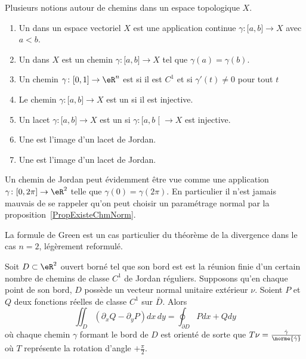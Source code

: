 \begin{definition}       \label{DEFooQZMSooYYkGDv}
    Plusieurs notions autour de chemins dans un espace topologique \( X\).
    \begin{enumerate}
        \item
    Un  dans un espace vectoriel \( X\) est une application continue \( \gamma\colon \mathopen[ a , b \mathclose]\to X\) avec \( a<b\).
        \item
    Un  dans \( X\) est un chemin \( \gamma\colon \mathopen[ a , b \mathclose]\to X\) tel que \( \gamma(a)=\gamma(b)\).
\item
    Un chemin \( \gamma\colon \mathopen[ 0 , 1 \mathclose]\to \eR^n\) est  si il est \( C^1\) et si \( \gamma'(t)\neq 0\) pour tout \( t\)
\item
    Le chemin \( \gamma\colon \mathopen[ a , b \mathclose]\to X\) est un  si il est injective.
\item
    Un lacet \( \gamma\colon \mathopen[ a , b \mathclose]\to X\) est un  si \( \gamma\colon \mathopen[ a , b \mathclose[\to X\) est injective.
        \item
            Une  est l'image d'un lacet de Jordan.
        \item 
            Une  est l'image d'un lacet de Jordan.
    \end{enumerate}
\end{definition}


\begin{normaltext}
    Un chemin de Jordan peut évidemment être vue comme une application \( \gamma\colon \mathopen[ 0 , 2\pi ]\to \eR^2\) telle que \( \gamma(0)=\gamma(2\pi)\). En particulier il n'est jamais mauvais de se rappeler qu'on peut choisir un paramétrage normal par la proposition~\ref{PropExisteChmNorm}.
\end{normaltext}

La formule de Green est un cas particulier du théorème de la divergence dans le cas \( n = 2\), légèrement reformulé.
\begin{theorem}
	Soit \( D \subset \eR^2\) ouvert borné tel que son bord est est la réunion finie d'un certain nombre de chemins de classe \( C^1\) de Jordan réguliers.  Supposons qu'en chaque point de son bord, \( D\) possède un vecteur normal unitaire extérieur \( \nu\). Soient \( P\) et \( Q\) deux fonctions réelles de classe \( C^1\) sur \( \bar D\). Alors
	\begin{equation}  \label{EqYLblSqV}
		\iint_D (\partial_xQ - \partial_yP)dx\,dy = \oint_{\partial D}
		Pd x + Q d y
	\end{equation}
	où chaque chemin \( \gamma\) formant le bord de \( D\) est orienté de
	sorte que \( T \nu = \frac{\dot\gamma}{\norme{\dot\gamma}}\) où \( T\)
	représente la rotation d'angle \( +\frac\pi2\).
\end{theorem}

